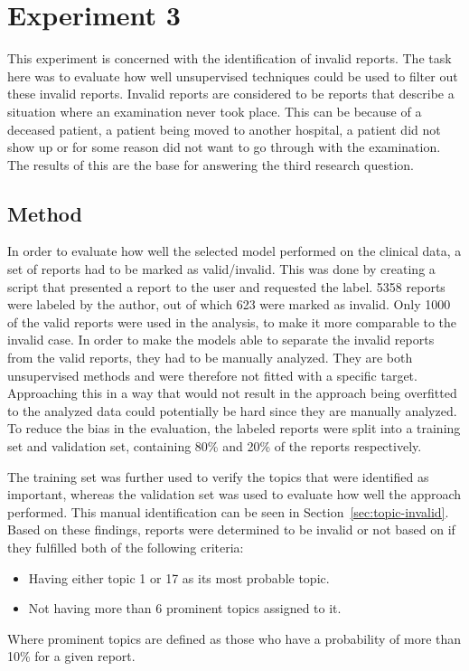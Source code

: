 \section{Experiment 3}
\label{sec:experiments-exp3}
This experiment is concerned with the identification of invalid reports.
The task here was to evaluate how well unsupervised techniques could be used to filter out these invalid reports.
Invalid reports are considered to be reports that describe a situation where an examination never took place.
This can be because of a deceased patient, a patient being moved to another hospital, a patient did not show up or for some reason did not want to go through with the examination.
The results of this are the base for answering the third research question.

\subsection{Method}
\label{sec:exp3-method}

In order to evaluate how well the selected model performed on the clinical data, a set of reports had to be marked as valid/invalid.
This was done by creating a script that presented a report to the user and requested the label.
5358 reports were labeled by the author, out of which 623 were marked as invalid. 
Only 1000 of the valid reports were used in the analysis, to make it more comparable to the invalid case.
In order to make the models able to separate the invalid reports from the valid reports, they had to be manually analyzed.
They are both unsupervised methods and were therefore not fitted with a specific target.
Approaching this in a way that would not result in the approach being overfitted to the analyzed data could potentially be hard since they are manually analyzed. 
To reduce the bias in the evaluation, the labeled reports were split into a training set and validation set, containing 80\% and 20\% of the reports respectively.

The training set was further used to verify the topics that were identified as important, whereas the validation set was used to evaluate how well the approach performed.
This manual identification can be seen in Section~\ref{sec:topic-invalid}.
Based on these findings, reports were determined to be invalid or not based on if they fulfilled both of the following criteria:
\begin{itemize}
    \item Having either topic 1 or 17 as its most probable topic.
    \item Not having more than 6 prominent topics assigned to it.
\end{itemize}
Where prominent topics are defined as those who have a probability of more than 10\% for a given report.


